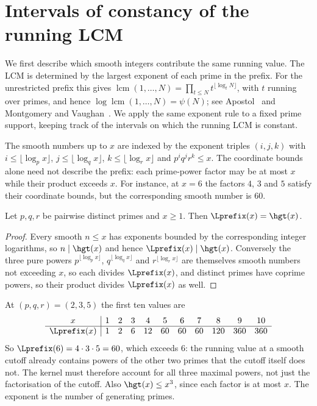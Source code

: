 \section{Intervals of constancy of the running LCM}\label{long269:sec:lcm}

We first describe which smooth integers contribute the same running value.
The LCM is determined by the largest exponent of each prime in the prefix.
For the unrestricted prefix this gives
$\operatorname{lcm}(1,\ldots,N)=\prod_{t\le N}t^{\lfloor\log_t N\rfloor}$,
with $t$ running over primes, and hence
$\log\operatorname{lcm}(1,\ldots,N)=\psi(N)$; see Apostol~\cite{apostol1976}
and Montgomery and Vaughan~\cite{montgomeryvaughan2007}.
We apply the same exponent rule to a fixed prime support, keeping track
of the intervals on which the running LCM is constant.

The smooth numbers up to $x$ are indexed by the exponent triples $(i,j,k)$ with
$i\le\lfloor\log_p x\rfloor$, $j\le\lfloor\log_q x\rfloor$,
$k\le\lfloor\log_r x\rfloor$ and $p^{i}q^{j}r^{k}\le x$.
The coordinate bounds alone need not describe the prefix: each prime-power
factor may be at most $x$ while their product exceeds $x$.  For instance,
at $x=6$ the factors $4$, $3$ and $5$ satisfy their coordinate bounds,
but the corresponding smooth number is $60$.

\begin{theorem}\label{long269:res:lcm}
Let $p,q,r$ be pairwise distinct primes and $x\ge1$.  Then
$\Lprefix(x)=\hgt(x)$.
\end{theorem}

\begin{proof}
Every smooth $n\le x$ has exponents bounded by the corresponding integer
logarithms, so $n\mid\hgt(x)$ and hence $\Lprefix(x)\mid\hgt(x)$.  Conversely
the three pure powers $p^{\lfloor\log_p x\rfloor}$,
$q^{\lfloor\log_q x\rfloor}$ and $r^{\lfloor\log_r x\rfloor}$ are themselves
smooth numbers not exceeding $x$, so each divides $\Lprefix(x)$, and distinct
primes have coprime powers, so their product divides $\Lprefix(x)$ as well.
\end{proof}


At $(p,q,r)=(2,3,5)$ the first ten values are
\[
\begin{array}{c|cccccccccc}
x&1&2&3&4&5&6&7&8&9&10\\ \hline
\Lprefix(x)&1&2&6&12&60&60&60&120&360&360
\end{array}
\]
So $\Lprefix(6)=4\cdot3\cdot5=60$, which exceeds $6$: the running value at a
smooth cutoff already contains powers of the other two primes that the cutoff
itself does not.  The kernel must therefore account for all three
maximal powers, not just the factorisation of the cutoff.
Also $\hgt(x)\le x^3$, since each factor is at most $x$.
The exponent is the number of generating primes.

